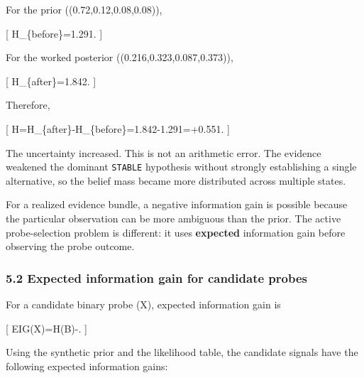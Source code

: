 \documentclass[
]{article}
\begin{document}
For the prior ((0.72,0.12,0.08,0.08)),

{[} H\_\{before\}=1.291. {]}

For the worked posterior ((0.216,0.323,0.087,0.373)),

{[} H\_\{after\}=1.842. {]}

Therefore,

{[} \Delta H=H\_\{after\}-H\_\{before\}=1.842-1.291=+0.551.
{]}

The uncertainty increased. This is not an arithmetic error. The evidence
weakened the dominant \texttt{STABLE} hypothesis without strongly
establishing a single alternative, so the belief mass became more
distributed across multiple states.

For a realized evidence bundle, a negative information gain is possible
because the particular observation can be more ambiguous than the prior.
The active probe-selection problem is different: it uses
\textbf{expected} information gain before observing the probe outcome.

\subsubsection{5.2 Expected information gain for candidate
probes}\label{expected-information-gain-for-candidate-probes}

For a candidate binary probe (X), expected information gain is

{[} EIG(X)=H(B)-\left[P(X=1)H(B\mid X=1)+P(X=0)H(B\mid X=0)\right]. {]}

Using the synthetic prior and the likelihood table, the candidate
signals have the following expected information gains:
\end{document}
